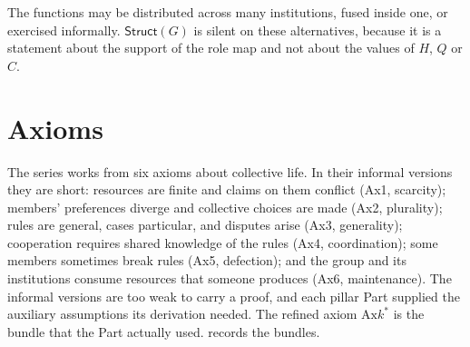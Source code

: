 \documentclass[11pt,letterpaper]{article}
\theoremstyle{definition}
\theoremstyle{remark}
\newcommand{\Struct}{\mathsf{Struct}}
\begin{document}
The functions may be distributed across many institutions, fused inside one, or exercised informally. $\Struct(G)$ is silent on these alternatives, because it is a statement about the support of the role map and not about the values of $H$, $Q$ or $C$.

\section{Axioms}
\label{sec:axioms}

The series works from six axioms about collective life. In their informal versions they are short: resources are finite and claims on them conflict (Ax1, scarcity); members' preferences diverge and collective choices are made (Ax2, plurality); rules are general, cases particular, and disputes arise (Ax3, generality); cooperation requires shared knowledge of the rules (Ax4, coordination); some members sometimes break rules (Ax5, defection); and the group and its institutions consume resources that someone produces (Ax6, maintenance). The informal versions are too weak to carry a proof, and each pillar Part supplied the auxiliary assumptions its derivation needed. The refined axiom $\mathrm{Ax}k^{*}$ is the bundle that the Part actually used.  records the bundles.
\end{document}
